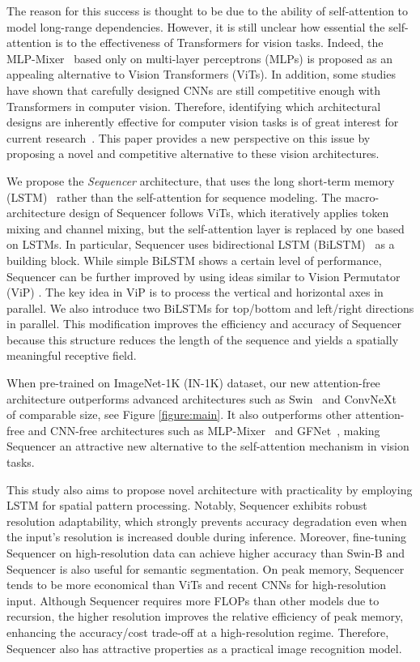\documentclass{article}
\begin{document}
The reason for this success is thought to be due to the ability of self-attention to model long-range dependencies. However, it is still unclear how essential the self-attention is to the effectiveness of Transformers for vision tasks. Indeed, the MLP-Mixer~\cite{tolstikhin2021mlp} based only on multi-layer perceptrons (MLPs) is proposed as an appealing alternative to Vision Transformers (ViTs). In addition, some studies~\cite{liu2022convnet, ding2022scaling} have shown that carefully designed CNNs are still competitive enough with Transformers in computer vision. Therefore, identifying which architectural designs are inherently effective for computer vision tasks is of great interest for current research~\cite{yu2021metaformer}. This paper provides a new perspective on this issue by proposing a novel and competitive alternative to these vision architectures.

We propose the {\it{Sequencer}} architecture, that uses the long short-term memory (LSTM)~\cite{hochreiter1997long} rather than the self-attention for sequence modeling. The macro-architecture design of Sequencer follows ViTs, which iteratively applies token mixing and channel mixing, but the self-attention layer is replaced by one based on LSTMs. In particular, Sequencer uses bidirectional LSTM (BiLSTM)~\cite{schuster1997bidirectional} as a building block. While simple BiLSTM shows a certain level of performance, Sequencer can be further improved by using ideas similar to Vision Permutator (ViP) \cite{hou2022vision}. The key idea in ViP is to process the vertical and horizontal axes in parallel. We also introduce two BiLSTMs for top/bottom and left/right directions in parallel. This modification improves the efficiency and accuracy of Sequencer because this structure reduces the length of the sequence and yields a spatially meaningful receptive field.

When pre-trained on ImageNet-1K (IN-1K) dataset, our new attention-free architecture outperforms advanced architectures such as Swin~\cite{liu2021swin} and ConvNeXt~\cite{liu2022convnet} of comparable size, see Figure \ref{figure:main}. It also outperforms other attention-free and CNN-free architectures such as MLP-Mixer~\cite{tolstikhin2021mlp} and GFNet~\cite{rao2021global}, making Sequencer an attractive new alternative to the self-attention mechanism in vision tasks.

This study also aims to propose novel architecture with practicality by employing LSTM for spatial pattern processing. Notably, Sequencer exhibits robust resolution adaptability, which strongly prevents accuracy degradation even when the input's resolution is increased double during inference. Moreover, fine-tuning Sequencer on high-resolution data can achieve higher accuracy than Swin-B \cite{liu2021swin} and Sequencer is also useful for semantic segmentation. On peak memory, Sequencer tends to be more economical than ViTs and recent CNNs for high-resolution input. Although Sequencer requires more FLOPs than other models due to recursion, the higher resolution improves the relative efficiency of peak memory, enhancing the accuracy/cost trade-off at a high-resolution regime. Therefore, Sequencer also has attractive properties as a practical image recognition model.
\end{document}

